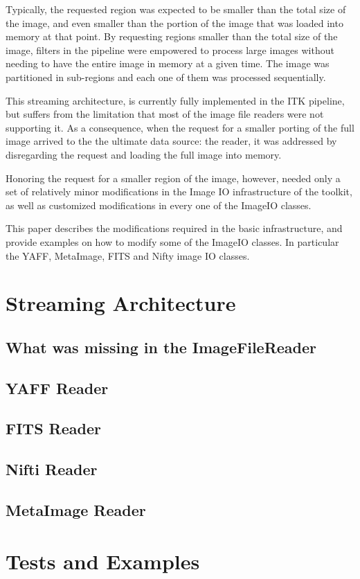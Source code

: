 \documentclass{InsightArticle}
\begin{document}
Typically, the requested region was expected to be smaller than the total size
of the image, and even smaller than the portion of the image that was loaded
into memory at that point. By requesting regions smaller than the total size of
the image, filters in the pipeline were empowered to process large images
without needing to have the entire image in memory at a given time. The image was
partitioned in sub-regions and each one of them was processed sequentially.

This streaming architecture, is currently fully implemented in the ITK
pipeline, but suffers from the limitation that most of the image file readers
were not supporting it. As a consequence, when the request for a smaller porting
of the full image arrived to the the ultimate data source: the reader, it was 
addressed by disregarding the request and loading the full image into memory.

Honoring the request for a smaller region of the image, however, needed only a set
of relatively minor modifications in the Image IO infrastructure of the toolkit, 
as well as customized modifications in every one of the ImageIO classes.

This paper describes the modifications required in the basic infrastructure,
and provide examples on how to modify some of the ImageIO classes. In
particular the YAFF, MetaImage, FITS and Nifty image IO classes.



\section{Streaming Architecture}

\subsection{What was missing in the ImageFileReader}

\subsection{YAFF Reader}
\subsection{FITS Reader}
\subsection{Nifti Reader}
\subsection{MetaImage Reader}

\section{Tests and Examples}


%
%



\end{document}
